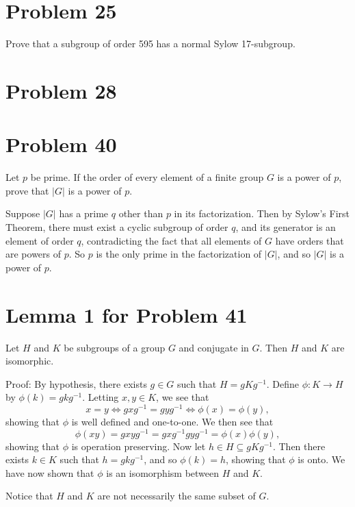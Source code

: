 \documentclass{article}
\begin{document}
\section*{Problem 25}

Prove that a subgroup of order 595 has a normal Sylow 17-subgroup.

\section*{Problem 28}

\section*{Problem 40}

Let $p$ be prime.  If the order of every element of a finite group $G$ is a
power of $p$, prove that $|G|$ is a power of $p$.

Suppose $|G|$ has a prime $q$ other than $p$ in its factorization.
Then by Sylow's First Theorem, there must exist a cyclic subgroup of
order $q$, and its generator is an element of order $q$, contradicting
the fact that all elements of $G$ have orders that are powers of $p$.
So $p$ is the only prime in the factorization of $|G|$, and so $|G|$
is a power of $p$.

\section*{Lemma 1 for Problem 41}

Let $H$ and $K$ be subgroups of a group $G$ and conjugate in $G$.
Then $H$ and $K$ are isomorphic.

Proof: By hypothesis, there exists $g\in G$ such that $H=gKg^{-1}$.
Define $\phi:K\to H$ by $\phi(k)=gkg^{-1}$.  Letting $x,y\in K$,
we see that
\begin{equation*}
x=y\iff gxg^{-1}=gyg^{-1}\iff\phi(x)=\phi(y),
\end{equation*}
showing that $\phi$ is well defined and one-to-one.  We then see that
\begin{equation*}
\phi(xy)=gxyg^{-1}=gxg^{-1}gyg^{-1}=\phi(x)\phi(y),
\end{equation*}
showing that $\phi$ is operation preserving.  Now let $h\in H\subseteq gKg^{-1}$.
Then there exists $k\in K$ such that $h=gkg^{-1}$, and so $\phi(k)=h$, showing
that $\phi$ is onto.  We have now shown that $\phi$ is an isomorphism between
$H$ and $K$.

Notice that $H$ and $K$ are not necessarily the same subset of $G$.
\end{document}

